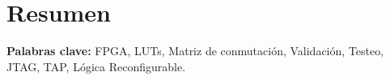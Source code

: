 \chapter*{Resumen}
\thispagestyle{empty}



\bigskip

\textbf{Palabras clave: } FPGA, LUTs, Matriz de conmutación, Validación, Testeo, JTAG, TAP, Lógica Reconfigurable.






